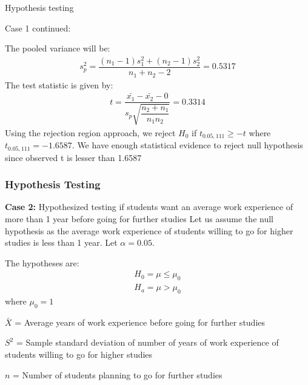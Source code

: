 \documentclass{beamer}
\begin{document}
\begin{frame}{Hypothesis testing}

    \begin{block}{Case 1 continued:}

        The pooled variance will be:
        \begin{align}
            s^2_p=\dfrac{(n_1-1)s^2_1+(n_2-1)s^2_2}{n_1+n_2-2}=0.5317
        \end{align}
        The test statistic is given by:
        \begin{align}
            t=\dfrac{\bar{x_1}-\bar{x_2}-0}{s_p\sqrt{\dfrac{n_2+n_1}{n_1n_2}}}=0.3314
        \end{align}
        Using the rejection region approach, we reject $H_0$ if
        $t_{0.05,111}\geq -t$ where $t_{0.05,111}=-1.6587$. We have enough
        statistical
        evidence to reject null hypothesis since observed t is lesser than
        1.6587

    \end{block}
\end{frame}


\begin{frame}
  \frametitle{Hypothesis Testing}
  \begin{block}{\textbf{Case 2:}{ Hypothesized testing if students want an average work experience of more than 1 year before going for further studies }}
     Let us assume the null hypothesis as the average work experience of students willing to go for higher studies is  less than 1 year. Let $\alpha = 0.05$.

     The hypotheses are:
      \begin{align*}
          H_0=\mu\leq \mu_0\\
          H_a=\mu > \mu_0
      \end{align*}
      where $\mu_0 = 1$

     \begin{enumerate*}
         \item  $\bar{X}$ = Average years of work experience before going for further studies\\
         \item  $S^2$ = Sample standard deviation of number of years of work experience of students willing to go for higher studies\\
         \item $n$ = Number of students planning to go for further studies\\
     \end{enumerate*}
        \end{block}
    \end{frame}
\end{document}
